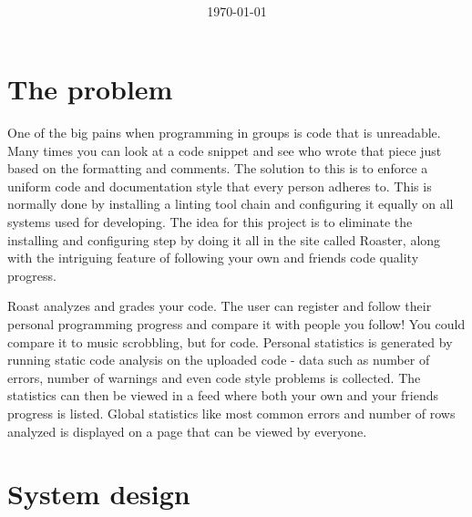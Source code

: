 \documentclass[12pt,a4paper]{report}
\title{
    \coursecode{} \\
    \coursename{} \\
    \vspace{1.8em}
    \textbf{\projectname{}} \break
    \author{
        \authorsinfo{}
    } \break{}
    \schoolinfo{}}
\date{\today}
\begin{document}
\maketitle
\thispagestyle{empty} %
\newpage

{\hypersetup{linkcolor=black}
    \tableofcontents}
\newpage

\listoftodos
{}
\newpage

\chapter{The problem}
One of the big pains when programming in groups is code that is unreadable. Many times you can look at a code snippet and see who wrote that piece
just based on the formatting and comments. The solution to this is to enforce a uniform code and documentation style that every person adheres to.
This is normally done by installing a linting tool chain and configuring it equally on all systems used for developing. 
The idea for this project is to eliminate the installing and configuring step by doing it all in the site called Roaster, along with the intriguing feature of following your own and friends code quality progress.

Roast analyzes and grades your code. The user can register and follow their personal programming progress and compare it with people you follow! 
You could compare it to music scrobbling, but for code.
Personal statistics is generated by running static code analysis on the uploaded code - data such as number of errors, number of warnings and even code style problems is collected.
The statistics can then be viewed in a feed where both your own and your friends progress is listed.
Global statistics like most common errors and number of rows analyzed is displayed on a page that can be viewed by everyone.

\chapter{System design}
\end{document}
